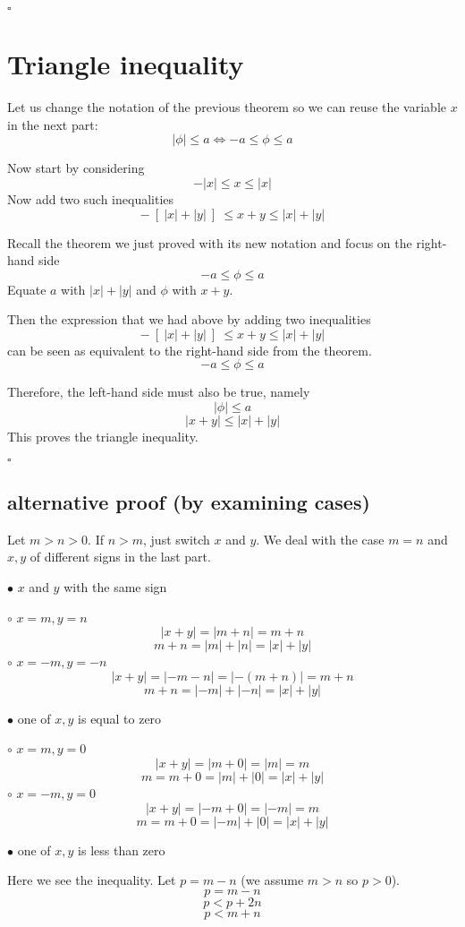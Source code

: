 \documentclass[11pt, oneside]{article}
\begin{document}
$\square$

\section{Triangle inequality}

Let us change the notation of the previous theorem so we can reuse the variable $x$ in the next part:
\[ | \phi | \le a \iff -a \le \phi \le a \]

Now start by considering
\[ - |x| \le x \le |x| \]
Now add two such inequalities 
\[ - \ [ \ |x| +  |y| \ ] \  \le x + y \le  |x| + |y|  \]

Recall the theorem we just proved with its new notation and focus on the right-hand side
\[  -a \le \phi \le a \]
Equate $a$ with $|x| + |y|$ and $\phi$ with $x + y$.  

Then the expression that we had above by adding two inequalities
\[ - \ [ \ |x| +  |y| \ ] \  \le x + y \le  |x| + |y|  \]
can be seen as equivalent to the right-hand side from the theorem.  
\[  -a \le \phi \le a \]

Therefore, the left-hand side must also be true, namely
\[ |\phi| \le a \]
\[ |x + y| \le  |x| +  |y| \]
This proves the triangle inequality.

$\square$

\subsection*{alternative proof (by examining cases)}

Let $m > n > 0$.  If $n > m$, just switch $x$ and $y$.  We deal with the case $m=n$ and $x,y$ of different signs in the last part.

$\bullet$  $x$ and $y$ with the same sign

$\circ$  $x = m, y = n$
\[ |x + y| = |m + n| = m + n \]
\[ m + n = |m| + |n| = |x| + |y| \]
$\circ$  $x = -m, y = -n$
\[ |x + y| = |-m - n| = |-(m + n)| = m + n \]
\[ m + n = |-m| + |-n| = |x| + |y| \]

$\bullet$  one of $x,y$ is equal to zero

$\circ$  $x = m, y = 0$
\[ |x + y| = |m + 0| = |m| = m \]
\[ m = m + 0 = |m| + |0| = |x| + |y| \]
$\circ$  $x = -m, y = 0$
\[ |x + y| = |-m + 0| = |-m| = m \]
\[ m = m + 0 = |-m| + |0| = |x| + |y| \]

$\bullet$  one of $x,y$ is less than zero

Here we see the inequality.  Let $p = m - n$ (we assume $m > n$ so $p > 0$).
\[ p = m - n \]
\[ p < p + 2n \]
\[ p < m + n \]
\end{document}

